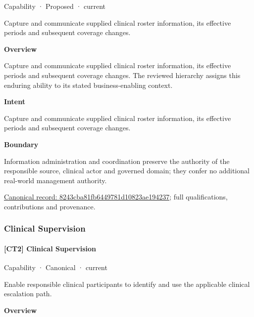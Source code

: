 \label{element:8243cba81fb6449781d10823ae194237}
{\small Capability · Proposed · current}\par

Capture and communicate supplied clinical roster information, its effective periods and subsequent coverage changes.



\textbf{Overview}



Capture and communicate supplied clinical roster information, its effective periods and subsequent coverage changes. The reviewed hierarchy assigns this enduring ability to its stated business-enabling context.



\textbf{Intent}



Capture and communicate supplied clinical roster information, its effective periods and subsequent coverage changes.



\textbf{Boundary}



Information administration and coordination preserve the authority of the responsible source, clinical actor and governed domain; they confer no additional real-world management authority.


{\footnotesize \href{../../../../continuum/strategy/capability/8243cba81fb6449781d10823ae194237.md}{Canonical record: 8243cba81fb6449781d10823ae194237}; full qualifications, contributions and provenance.}\par
\subsubsection{Clinical Supervision}

\paragraph{[CT2] Clinical Supervision}

\label{element:f697b1ac79b544749315f31819b17969}
{\small Capability · Canonical · current}\par

Enable responsible clinical participants to identify and use the applicable clinical escalation path.



\textbf{Overview}



